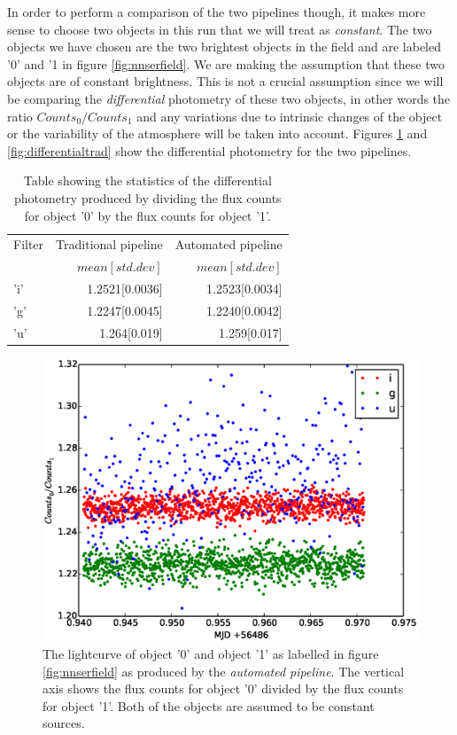In order to perform a comparison of the two pipelines though, it makes more sense to choose two objects in this run that we will treat as \emph{constant}. The two objects we have chosen are the two brightest objects in the field and are labeled '0' and '1 in figure \ref{fig:nnserfield}. We are making the assumption that these two objects are of constant brightness. This is not a crucial assumption since we will be comparing the \emph{differential} photometry of these two objects, in other words the ratio $Counts_{0}/Counts_{1}$ and any variations due to intrinsic changes of the object or the variability of the atmosphere will be taken into account. Figures \ref{fig:differentialauto} and \ref{fig:differentialtrad} show the differential photometry for the two pipelines. 

\begin{table}[ht]
  \label{tab:differential}
  \caption{Table showing the statistics of the differential photometry produced by dividing the flux counts for object '0' by the flux counts for object '1'.}
  \centering
  \begin{tabular}{|l|r|r|}
    \hline
    Filter & Traditional pipeline & Automated pipeline  \\
           &  $mean[std. dev]$    & $mean[std. dev]$ \\
    \hline
    'i'    & 1.2521[0.0036]       & 1.2523[0.0034] \\
    'g'    & 1.2247[0.0045]       & 1.2240[0.0042]\\
    'u'    & 1.264[0.019]         & 1.259[0.017] \\
    \hline
   \end{tabular}
\end{table}

\begin{figure}[!h]
\centering
\includegraphics[width=140mm]{images/differential_auto.eps}
\caption{The lightcurve of object '0' and object '1' as labelled in figure \ref{fig:nnserfield} as produced by the \emph{automated pipeline}. The vertical axis shows the flux counts for object '0' divided by the flux counts for object '1'. Both of the objects are assumed to be constant sources. }
\label{fig:differentialauto}
\end{figure}

